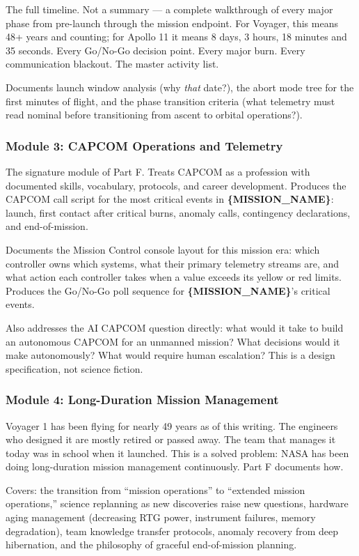 \documentclass[11pt,letterpaper]{article}
\newcommand{\param}[1]{\textcolor{paramred}{\textbf{\{#1\}}}}
\begin{document}
The full timeline. Not a summary --- a complete walkthrough of every major phase from pre-launch through the mission endpoint. For Voyager, this means 48+ years and counting; for Apollo 11 it means 8 days, 3 hours, 18 minutes and 35 seconds. Every Go/No-Go decision point. Every major burn. Every communication blackout. The master activity list.

Documents launch window analysis (why \textit{that} date?), the abort mode tree for the first minutes of flight, and the phase transition criteria (what telemetry must read nominal before transitioning from ascent to orbital operations?).

\subsubsection{Module 3: CAPCOM Operations and Telemetry}

The signature module of Part F. Treats CAPCOM as a profession with documented skills, vocabulary, protocols, and career development. Produces the CAPCOM call script for the most critical events in \param{MISSION\_NAME}: launch, first contact after critical burns, anomaly calls, contingency declarations, and end-of-mission.

Documents the Mission Control console layout for this mission era: which controller owns which systems, what their primary telemetry streams are, and what action each controller takes when a value exceeds its yellow or red limits. Produces the Go/No-Go poll sequence for \param{MISSION\_NAME}'s critical events.

Also addresses the AI CAPCOM question directly: what would it take to build an autonomous CAPCOM for an unmanned mission? What decisions would it make autonomously? What would require human escalation? This is a design specification, not science fiction.

\subsubsection{Module 4: Long-Duration Mission Management}

Voyager 1 has been flying for nearly 49 years as of this writing. The engineers who designed it are mostly retired or passed away. The team that manages it today was in school when it launched. This is a solved problem: NASA has been doing long-duration mission management continuously. Part F documents how.

Covers: the transition from ``mission operations'' to ``extended mission operations,'' science replanning as new discoveries raise new questions, hardware aging management (decreasing RTG power, instrument failures, memory degradation), team knowledge transfer protocols, anomaly recovery from deep hibernation, and the philosophy of graceful end-of-mission planning.
\end{document}
